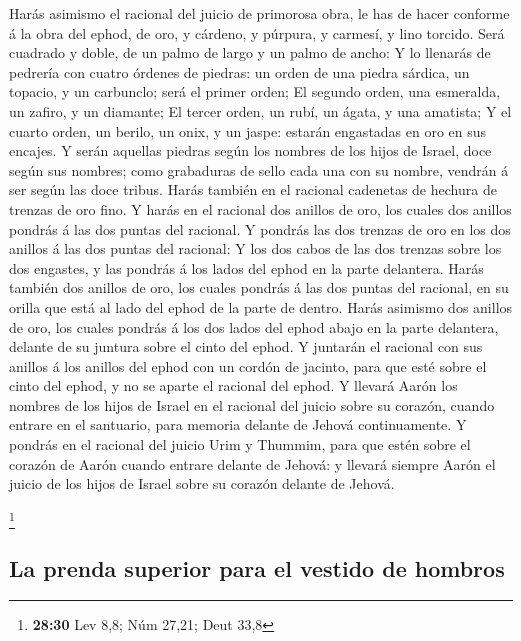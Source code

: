  Harás asimismo el racional del juicio de primorosa obra,
le has de hacer conforme á la obra del ephod, de oro, y cárdeno, y
púrpura, y carmesí, y lino torcido.  Será cuadrado y doble,
de un palmo de largo y un palmo de ancho:  Y lo llenarás de
pedrería con cuatro órdenes de piedras: un orden de una piedra sárdica,
un topacio, y un carbunclo; será el primer orden;  El
segundo orden, una esmeralda, un zafiro, y un diamante;  El
tercer orden, un rubí, un ágata, y una amatista;  Y el
cuarto orden, un berilo, un onix, y un jaspe: estarán engastadas en oro
en sus encajes.  Y serán aquellas piedras según los nombres
de los hijos de Israel, doce según sus nombres; como grabaduras de sello
cada una con su nombre, vendrán á ser según las doce tribus.
 Harás también en el racional cadenetas de hechura de
trenzas de oro fino.  Y harás en el racional dos anillos de
oro, los cuales dos anillos pondrás á las dos puntas del racional.
 Y pondrás las dos trenzas de oro en los dos anillos á las
dos puntas del racional:  Y los dos cabos de las dos
trenzas sobre los dos engastes, y las pondrás á los lados del ephod en
la parte delantera.  Harás también dos anillos de oro, los
cuales pondrás á las dos puntas del racional, en su orilla que está al
lado del ephod de la parte de dentro.  Harás asimismo dos
anillos de oro, los cuales pondrás á los dos lados del ephod abajo en la
parte delantera, delante de su juntura sobre el cinto del ephod.
 Y juntarán el racional con sus anillos á los anillos del
ephod con un cordón de jacinto, para que esté sobre el cinto del ephod,
y no se aparte el racional del ephod.  Y llevará Aarón los
nombres de los hijos de Israel en el racional del juicio sobre su
corazón, cuando entrare en el santuario, para memoria delante de Jehová
continuamente.  Y pondrás en el racional del juicio Urim y
Thummim, para que estén sobre el corazón de Aarón cuando entrare delante
de Jehová: y llevará siempre Aarón el juicio de los hijos de Israel
sobre su corazón delante de Jehová.

\footnote{\textbf{28:30} Lev 8,8; Núm 27,21; Deut 33,8}

\hypertarget{la-prenda-superior-para-el-vestido-de-hombros}{%
\subsection{La prenda superior para el vestido de
hombros}\label{la-prenda-superior-para-el-vestido-de-hombros}}

